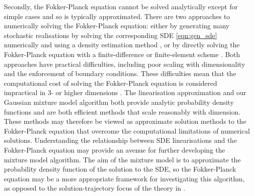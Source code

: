 Secondly, the Fokker-Planck equation cannot be solved analytically except for simple cases and so is typically approximated.
There are two approaches to numerically solving the Fokker-Planck equation: either by generating many stochastic realisations by solving the corresponding SDE \cref{eqn:gen_sde} numerically and using a density estimation method \citep{Silverman_2017_DensityEstimationStatistics}, or by directly solving the Fokker-Planck equation with a finite-difference or finite-element scheme \citep{PichlerEtAl_2013_NumericalSolutionFokker}.
Both approaches have practical difficulties, including poor scaling with dimensionality and the enforcement of boundary conditions.
These difficulties mean that the computational cost of solving the Fokker-Planck equation is considered impractical in \(3\)- or higher dimensions \citep{ZhaiEtAl_2022_DeepLearningMethod,Li_2019_DatadrivenMethodSteady,AllawalaMarston_2016_StatisticsStochasticallyForced,AndersonFarazmand_2024_FisherInformationShapemorphing}.
The linearisation approximation and our Gaussian mixture model algorithm both provide analytic probability density functions and are both efficient methods that scale reasonably with dimension.
These methods may therefore be viewed as approximate solution methods to the Fokker-Planck equation that overcome the computational limitations of numerical solutions.
Understanding the relationship between SDE linearisations and the Fokker-Planck equation may provide an avenue for further developing the mixture model algorithm.
The aim of the mixture model is to approximate the probability density function of the solution to the SDE, so the Fokker-Planck equation may be a more appropriate framework for investigating this algorithm, as opposed to the solution-trajectory focus of the theory in .

